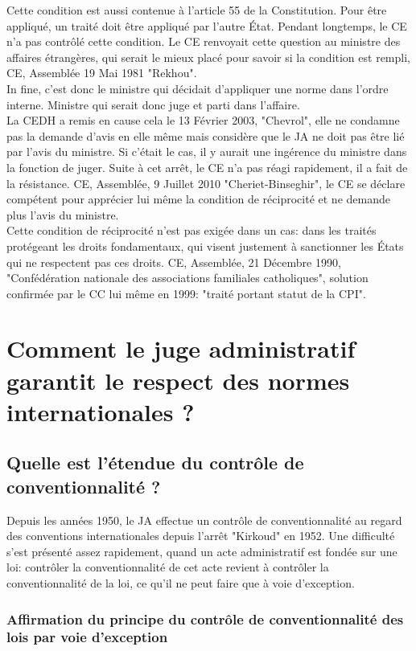 \documentclass[10pt, a4paper, openany]{book}
\begin{document}
Cette condition est aussi contenue à l'article 55 de la Constitution. Pour être appliqué, un traité doit être appliqué par l'autre État. Pendant longtemps, le CE n'a pas contrôlé cette condition. Le CE renvoyait cette question au ministre des affaires étrangères, qui serait le mieux placé pour savoir si la condition est rempli, CE, Assemblée 19 Mai 1981 "Rekhou". \\
In fine, c'est donc le ministre qui décidait d'appliquer une norme dans l'ordre interne. Ministre qui serait donc juge et parti dans l'affaire. \\
La CEDH a remis en cause cela le 13 Février 2003, "Chevrol", elle ne condamne pas la demande d'avis en elle même mais considère que le JA ne doit pas être lié par l'avis du ministre. Si c'était le cas, il y aurait une ingérence du ministre dans la fonction de juger. Suite à cet arrêt, le CE n'a pas réagi rapidement, il a fait de la résistance. CE, Assemblée, 9 Juillet 2010 "Cheriet-Binseghir", le CE se déclare compétent pour apprécier lui même la condition de réciprocité et ne demande plus l'avis du ministre. \\
Cette condition de réciprocité n'est pas exigée dans un cas: dans les traités protégeant les droits fondamentaux, qui visent justement à sanctionner les États qui ne respectent pas ces droits. CE, Assemblée, 21 Décembre 1990, "Confédération nationale des associations familiales catholiques", solution confirmée par le CC lui même en 1999: "traité portant statut de la CPI". 

\section{Comment le juge administratif garantit le respect des normes internationales ?}

\subsection{Quelle est l'étendue du contrôle de conventionnalité ?}

Depuis les années 1950, le JA effectue un contrôle de conventionnalité au regard des conventions internationales depuis l'arrêt "Kirkoud" en 1952. Une difficulté s'est présenté assez rapidement, quand un acte administratif est fondée sur une loi: contrôler la conventionnalité de cet acte revient à contrôler la conventionnalité de la loi, ce qu'il ne peut faire que à voie d'exception.

\subsubsection{Affirmation du principe du contrôle de conventionnalité des lois par voie d'exception}
\end{document}
